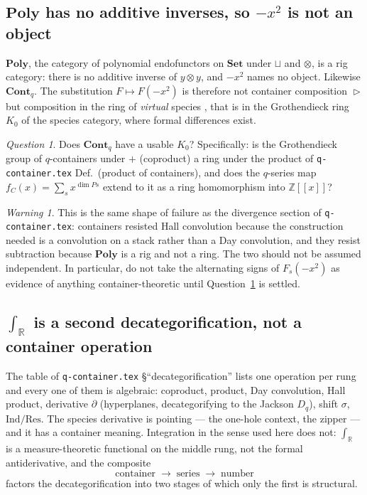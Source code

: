 \documentclass[11pt,a4paper]{article}
\theoremstyle{definition}
\theoremstyle{remark}
\newtheorem{warning}[theorem]{Warning}
\newtheorem{question}[theorem]{Question}
\newcommand{\ZZ}{\mathbb{Z}}
\newcommand{\RR}{\mathbb{R}}
\newcommand{\cat}[1]{\mathbf{#1}}
\newcommand{\Set}{\cat{Set}}
\newcommand{\Poly}{\cat{Poly}}
\newcommand{\Cont}{\cat{Cont}}
\newcommand{\con}{\mathrel{\vartriangleright}}
\begin{document}
\subsection{$\Poly$ has no additive inverses, so $-x^2$ is not an object}

$\Poly$, the category of polynomial endofunctors on $\Set$ under $\sqcup$ and
$\otimes$, is a rig category: there is no additive inverse of $y \otimes y$, and
$-x^2$ names no object. Likewise $\Cont_q$. The substitution $F \mapsto F(-x^2)$ is
therefore not container composition $\con$ but composition in the ring of
\emph{virtual} species \cite{Joyal86,Yeh}, that is in the Grothendieck ring $K_0$ of
the species category, where formal differences exist.

\begin{question}\label{q:k0}
Does $\Cont_q$ have a usable $K_0$? Specifically: is the Grothendieck group of
$q$-containers under $+$ (coproduct) a ring under the product of
\texttt{q-container.tex} Def.~\textup{(}product of containers\textup{)}, and does the $q$-series map
$f_C(x) = \sum_s x^{\dim P s}$ extend to it as a ring homomorphism into
$\ZZ[[x]]$?
\end{question}

\begin{warning}\label{warn:k0}
This is the same shape of failure as the divergence section of
\texttt{q-container.tex}: containers resisted Hall convolution because the
construction needed is a convolution on a stack rather than a Day convolution, and
they resist subtraction because $\Poly$ is a rig and not a ring. The two should not
be assumed independent. In particular, do not take the alternating signs of
$F_s(-x^2)$ as evidence of anything container-theoretic until
Question~\ref{q:k0} is settled.
\end{warning}

\subsection{$\int_\RR$ is a second decategorification, not a container operation}

The table of \texttt{q-container.tex} \S``decategorification'' lists one operation
per rung and every one of them is algebraic: coproduct, product, Day convolution,
Hall product, derivative $\partial$ (hyperplanes, decategorifying to the Jackson
$D_q$), shift $\sigma$, $\mathrm{Ind}/\mathrm{Res}$. The species derivative is
pointing --- the one-hole context, the zipper --- and it has a container meaning.
Integration in the sense used here does not: $\int_\RR$ is a measure-theoretic
functional on the middle rung, not the formal antiderivative, and the composite
\[
  \text{container} \;\longrightarrow\; \text{series} \;\longrightarrow\; \text{number}
\]
factors the decategorification into two stages of which only the first is structural.
\end{document}
